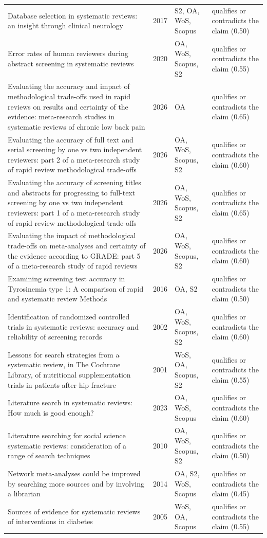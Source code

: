 \begin{longtable}{@{}%
  >{\raggedright\arraybackslash}p{}c%
  >{\raggedright\arraybackslash}p{}%
  >{\raggedright\arraybackslash}p{}@{}}
Database selection in systematic reviews: an insight through clinical neurology & 2017 & S2, OA, WoS, Scopus & qualifies or contradicts the claim (0.50) \\
Error rates of human reviewers during abstract screening in systematic reviews & 2020 & OA, WoS, Scopus, S2 & qualifies or contradicts the claim (0.55) \\
Evaluating the accuracy and impact of methodological trade-offs used in rapid reviews on results and certainty of the evidence: meta-research studies in systematic reviews of chronic low back pain & 2026 & OA & qualifies or contradicts the claim (0.65) \\
Evaluating the accuracy of full text and serial screening by one vs two independent reviewers: part 2 of a meta-research study of rapid review methodological trade-offs & 2026 & OA, WoS, Scopus, S2 & qualifies or contradicts the claim (0.60) \\
Evaluating the accuracy of screening titles and abstracts for progressing to full-text screening by one vs two independent reviewers: part 1 of a meta-research study of rapid review methodological trade-offs & 2026 & OA, WoS, Scopus, S2 & qualifies or contradicts the claim (0.65) \\
Evaluating the impact of methodological trade-offs on meta-analyses and certainty of the evidence according to GRADE: part 5 of a meta-research study of rapid reviews & 2026 & OA, WoS, Scopus, S2 & qualifies or contradicts the claim (0.60) \\
Examining screening test accuracy in Tyrosinemia type 1: A comparison of rapid and systematic review Methods & 2016 & OA, S2 & qualifies or contradicts the claim (0.50) \\
Identification of randomized controlled trials in systematic reviews: accuracy and reliability of screening records & 2002 & OA, WoS, Scopus, S2 & qualifies or contradicts the claim (0.60) \\
Lessons for search strategies from a systematic review, in The Cochrane Library, of nutritional supplementation trials in patients after hip fracture & 2001 & WoS, OA, Scopus, S2 & qualifies or contradicts the claim (0.55) \\
Literature search in systematic reviews: How much is good enough? & 2023 & OA, WoS, Scopus & qualifies or contradicts the claim (0.60) \\
Literature searching for social science systematic reviews: consideration of a range of search techniques & 2010 & OA, WoS, Scopus, S2 & qualifies or contradicts the claim (0.50) \\
Network meta-analyses could be improved by searching more sources and by involving a librarian & 2014 & OA, S2, WoS, Scopus & qualifies or contradicts the claim (0.45) \\
Sources of evidence for systematic reviews of interventions in diabetes & 2005 & WoS, OA, Scopus & qualifies or contradicts the claim (0.55) \\
\end{longtable}
\endgroup
